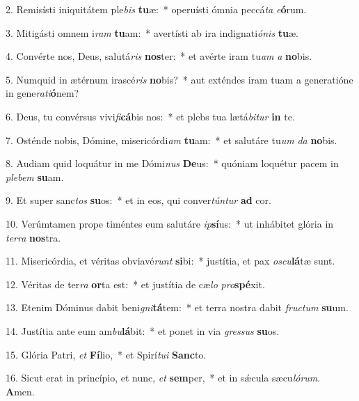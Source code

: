 2. Remisísti iniquitátem ple\textit{bis} \textbf{tu}æ:~*  operuísti ómnia peccá\textit{ta} \textit{e}\textbf{ó}rum.\

3. Mitigásti omnem i\textit{ram} \textbf{tu}am:~*  avertísti ab ira indignati\textit{ó}\textit{nis} \textbf{tu}æ.\

4. Convérte nos, Deus, salutá\textit{ris} \textbf{nos}ter:~*  et avérte iram tu\textit{am} \textit{a} \textbf{no}bis.\

5. Numquid in ætérnum irascé\textit{ris} \textbf{no}bis?~*  aut exténdes iram tuam a generatióne in gene\textit{ra}\textit{ti}\textbf{ó}nem?\

6. Deus, tu convérsus vivi\textit{fi}\textbf{cá}bis nos:~*  et plebs tua lætá\textit{bi}\textit{tur} \textbf{in} te.\

7. Osténde nobis, Dómine, misericórdi\textit{am} \textbf{tu}am:~*  et salutáre tu\textit{um} \textit{da} \textbf{no}bis.\

8. Audiam quid loquátur in me Dómi\textit{nus} \textbf{De}us:~*  quóniam loquétur pacem in \textit{ple}\textit{bem} \textbf{su}am.\

9. Et super sanc\textit{tos} \textbf{su}os:~*  et in eos, qui conver\textit{tún}\textit{tur} \textbf{ad} cor.\

10. Verúmtamen prope timéntes eum salutáre \textit{ip}\textbf{sí}us:~*  ut inhábitet glória in \textit{ter}\textit{ra} \textbf{nos}tra.\

11. Misericórdia, et véritas obviavé\textit{runt} \textbf{si}bi:~*  justítia, et pax \textit{os}\textit{cu}\textbf{lá}tæ sunt.\

12. Véritas de ter\textit{ra} \textbf{or}ta est:~*  et justítia de cæ\textit{lo} \textit{pro}\textbf{spé}xit.\

13. Etenim Dóminus dabit beni\textit{gni}\textbf{tá}tem:~*  et terra nostra dabit \textit{fruc}\textit{tum} \textbf{su}um.\

14. Justítia ante eum am\textit{bu}\textbf{lá}bit:~*  et ponet in via \textit{gres}\textit{sus} \textbf{su}os.\

15. Glória Patri, \textit{et} \textbf{Fí}lio,~*  et Spirí\textit{tu}\textit{i} \textbf{Sanc}to.\

16. Sicut erat in princípio, et nunc, \textit{et} \textbf{sem}per,~*  et in sǽcula sæcu\textit{ló}\textit{rum}. \textbf{A}men.\

